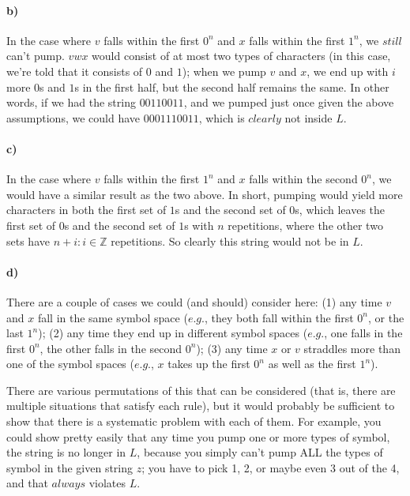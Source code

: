\documentclass[a4paper]{article}
\begin{document}
\paragraph{b)} In the case where $v$ falls within the first $0^n$ and $x$ falls within the first $1^n$, we $\textit{still}$ can't pump. $vwx$ would consist of at most two types of characters (in this case, we're told that it consists of $0$ and $1$); when we pump $v$ and $x$, we end up with $i$ more $0$s and $1$s in the first half, but the second half remains the same. In other words, if we had the string $00110011$, and we pumped just once given the above assumptions, we could have $0001110011$, which is $\textit{clearly}$ not inside $L$.

\paragraph{c)} In the case where $v$ falls within the first $1^n$ and $x$ falls within the second $0^n$, we would have a similar result as the two above. In short, pumping would yield more characters in both the first set of $1$s and the second set of $0$s, which leaves the first set of $0$s and the second set of $1$s with $n$ repetitions, where the other two sets have $n + i : i \in \mathbb{Z}$ repetitions. So clearly this string would not be in $L$.

\paragraph{d)} There are a couple of cases we could (and should) consider here: (1) any time $v$ and $x$ fall in the same symbol space ($\textit{e.g.}$, they both fall within the first $0^n$, or the last $1^n$); (2) any time they end up in different symbol spaces ($\textit{e.g.}$, one falls in the first $0^n$, the other falls in the second $0^n$); (3) any time $x$ or $v$ straddles more than one of the symbol spaces ($\textit{e.g.}$, $x$ takes up the first $0^n$ as well as the first $1^n$).

There are various permutations of this that can be considered (that is, there are multiple situations that satisfy each rule), but it would probably be sufficient to show that there is a systematic problem with each of them. For example, you could show pretty easily that any time you pump one or more types of symbol, the string is no longer in $L$, because you simply can't pump ALL the types of symbol in the given string $z$; you have to pick 1, 2, or maybe even 3 out of the 4, and that $\textit{always}$ violates $L$.
\end{document}
